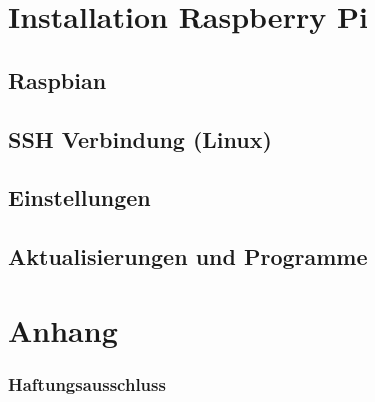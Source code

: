 \maketitle

\tableofcontents

\chapter{Installation Raspberry Pi}

\section{Raspbian}





\section{SSH Verbindung (Linux)} 


\section{Einstellungen}



\clearpage
\section{Aktualisierungen und Programme}




\chapter*{Anhang}





\subsection*{Haftungsausschluss}


